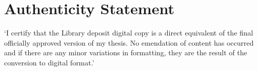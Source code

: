 \chapter*{Authenticity Statement}
`I certify that the Library deposit digital copy is a direct equivalent of the final officially approved version of my thesis.
No emendation of content has occurred and if there are any minor variations in formatting, they are the result of the conversion to digital format.'
